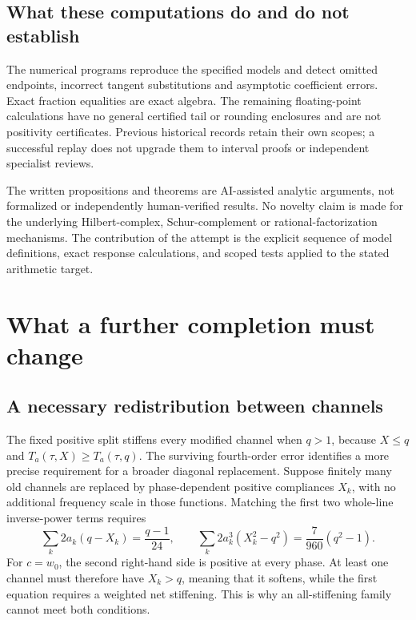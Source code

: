 \documentclass[11pt]{article}
\numberwithin{equation}{section}
\theoremstyle{definition}
\theoremstyle{remark}
\begin{document}
\subsection{What these computations do and do not establish}
The numerical programs reproduce the specified models and detect omitted endpoints, incorrect tangent substitutions and asymptotic coefficient errors. Exact fraction equalities are exact algebra. The remaining floating-point calculations have no general certified tail or rounding enclosures and are not positivity certificates. Previous historical records retain their own scopes; a successful replay does not upgrade them to interval proofs or independent specialist reviews.

The written propositions and theorems are AI-assisted analytic arguments, not formalized or independently human-verified results. No novelty claim is made for the underlying Hilbert-complex, Schur-complement or rational-factorization mechanisms. The contribution of the attempt is the explicit sequence of model definitions, exact response calculations, and scoped tests applied to the stated arithmetic target.

\section{What a further completion must change}
\label{sec:outlook}
\subsection{A necessary redistribution between channels}
The fixed positive split stiffens every modified channel when $q>1$, because $X\le q$ and $T_a(\tau,X)\ge T_a(\tau,q)$. The surviving fourth-order error identifies a more precise requirement for a broader diagonal replacement. Suppose finitely many old channels are replaced by phase-dependent positive compliances $X_k$, with no additional frequency scale in those functions. Matching the first two whole-line inverse-power terms requires
\begin{equation}
 \sum_k2a_k(q-X_k)=\frac{q-1}{24},\qquad
 \sum_k2a_k^3(X_k^2-q^2)=\frac7{960}(q^2-1).
 \label{eq:momentconditions}
\end{equation}
For $c=w_0$, the second right-hand side is positive at every phase. At least one channel must therefore have $X_k>q$, meaning that it softens, while the first equation requires a weighted net stiffening. This is why an all-stiffening family cannot meet both conditions.
\end{document}
